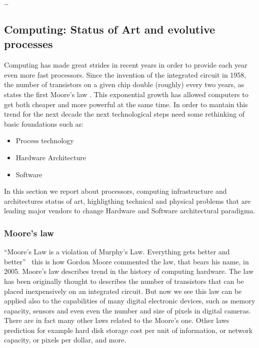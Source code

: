 \dots
\FloatBarrier
\subsection{Computing: Status of Art and evolutive processes}

Computing has made great strides in recent years in order to provide each year even more fast processors.
Since the invention of the integrated circuit in 1958, the number of transistors on a given chip double 
(roughly) every two years, as states the first Moore's law \cite{MooreLaw}. This exponential growth has allowed computers to get 
both cheaper and more powerful at the same time. In order to mantain this trend for the next decade the next technological steps need some rethinking of basic foundations such as:
\begin{itemize}
\item Process technology
\item Hardware Architecture
\item Software %
\end{itemize}

In this section we report about processors, computing infrastructure and architectures status of art, highligthing technical and physical  problems that are leading major vendors to change Hardware and Software architectural paradigma.  
\FloatBarrier
\subsubsection{Moore's law}

``Moore's Law is a violation of Murphy's Law. Everything gets better and better''~\cite{MooresFrase2}
 this is how Gordon Moore
commented the law, that bears his name, in 2005. Moore's law describes trend in the history of computing
hardware. The law has been originally thought to describes the number of transistors that can be placed
inexpensively on an integrated circuit. But now we see this law can be applied also to the capabilities
of many digital electronic devices, such as memory capacity, sensors and even even the number and size  %
of pixels in digital cameras. There are in fact many other laws related to the Moore's one. Other laws
prediction for example hard disk storage cost per unit of information, or network capacity, or pixels
per dollar, and more.

